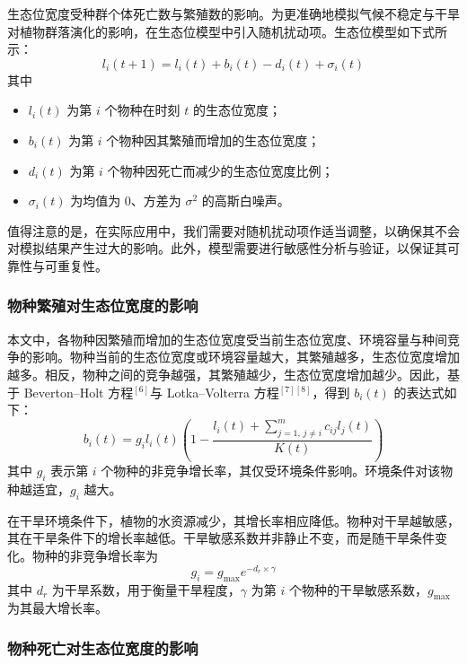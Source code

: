 \documentclass[11pt,a4paper]{ctexart}
\begin{document}
生态位宽度受种群个体死亡数与繁殖数的影响。为更准确地模拟气候不稳定与干旱对植物群落演化的影响，在生态位模型中引入随机扰动项。生态位模型如下式所示：
\begin{equation}
l_i(t+1)=l_i(t)+b_i(t)-d_i(t)+\sigma_i(t)
\end{equation}
其中
\begin{itemize}
\item $l_i(t)$ 为第 $i$ 个物种在时刻 $t$ 的生态位宽度；
\item $b_i(t)$ 为第 $i$ 个物种因其繁殖而增加的生态位宽度；
\item $d_i(t)$ 为第 $i$ 个物种因死亡而减少的生态位宽度比例；
\item $\sigma_i(t)$ 为均值为 $0$、方差为 $\sigma^2$ 的高斯白噪声。
\end{itemize}

值得注意的是，在实际应用中，我们需要对随机扰动项作适当调整，以确保其不会对模拟结果产生过大的影响。此外，模型需要进行敏感性分析与验证，以保证其可靠性与可重复性。

\subsubsection{物种繁殖对生态位宽度的影响}

本文中，各物种因繁殖而增加的生态位宽度受当前生态位宽度、环境容量与种间竞争的影响。物种当前的生态位宽度或环境容量越大，其繁殖越多，生态位宽度增加越多。相反，物种之间的竞争越强，其繁殖越少，生态位宽度增加越少。因此，基于 Beverton--Holt 方程$^{[6]}$与 Lotka--Volterra 方程$^{[7][8]}$，得到 $b_i(t)$ 的表达式如下：
\begin{equation}
b_i(t)=g_i l_i(t)\left(1-\frac{l_i(t)+\sum_{j=1,\,j\neq i}^{m}c_{ij}l_j(t)}{K(t)}\right)
\end{equation}
其中 $g_i$ 表示第 $i$ 个物种的非竞争增长率，其仅受环境条件影响。环境条件对该物种越适宜，$g_i$ 越大。

在干旱环境条件下，植物的水资源减少，其增长率相应降低。物种对干旱越敏感，其在干旱条件下的增长率越低。干旱敏感系数并非静止不变，而是随干旱条件变化。物种的非竞争增长率为
\begin{equation}
g_i=g_{\max}e^{-d_r\times\gamma}
\end{equation}
其中 $d_r$ 为干旱系数，用于衡量干旱程度，$\gamma$ 为第 $i$ 个物种的干旱敏感系数，$g_{\max}$ 为其最大增长率。

\subsubsection{物种死亡对生态位宽度的影响}
\end{document}
